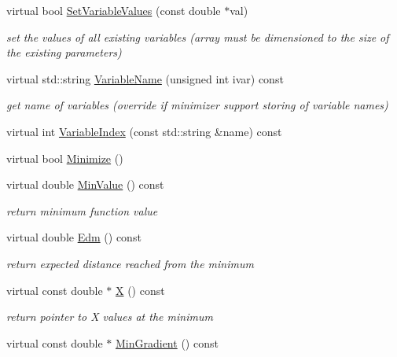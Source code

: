 \begin{DoxyCompactItemize}
virtual bool \mbox{\hyperlink{classROOT_1_1Minuit2_1_1Minuit2Minimizer_a9511e9711f3d1505556af30046c87d03}{Set\+Variable\+Values}} (const double $\ast$val)
\begin{DoxyCompactList}\small\item\em set the values of all existing variables (array must be dimensioned to the size of the existing parameters) \end{DoxyCompactList}\item 
virtual std\+::string \mbox{\hyperlink{classROOT_1_1Minuit2_1_1Minuit2Minimizer_a8f5a6dc65fdfeb0351039d80f7c94968}{Variable\+Name}} (unsigned int ivar) const
\begin{DoxyCompactList}\small\item\em get name of variables (override if minimizer support storing of variable names) \end{DoxyCompactList}\item 
virtual int \mbox{\hyperlink{classROOT_1_1Minuit2_1_1Minuit2Minimizer_a93839e851d16fff50898af2159d8863d}{Variable\+Index}} (const std\+::string \&name) const
\item 
virtual bool \mbox{\hyperlink{classROOT_1_1Minuit2_1_1Minuit2Minimizer_af5d2da195d2b1a7eac6d9b8859eec2b9}{Minimize}} ()
\item 
virtual double \mbox{\hyperlink{classROOT_1_1Minuit2_1_1Minuit2Minimizer_a4a1c7fc174527aefab3d8c87bf8c0672}{Min\+Value}} () const
\begin{DoxyCompactList}\small\item\em return minimum function value \end{DoxyCompactList}\item 
virtual double \mbox{\hyperlink{classROOT_1_1Minuit2_1_1Minuit2Minimizer_ab9c1bfaaaf4c12acd1fd96ece3509269}{Edm}} () const
\begin{DoxyCompactList}\small\item\em return expected distance reached from the minimum \end{DoxyCompactList}\item 
virtual const double $\ast$ \mbox{\hyperlink{classROOT_1_1Minuit2_1_1Minuit2Minimizer_ac9372eb08937cf14acb8862ba3166c26}{X}} () const
\begin{DoxyCompactList}\small\item\em return pointer to X values at the minimum \end{DoxyCompactList}\item 
virtual const double $\ast$ \mbox{\hyperlink{classROOT_1_1Minuit2_1_1Minuit2Minimizer_a52c6b3a13108b64366b1acd43f7e2b9a}{Min\+Gradient}} () const

\end{DoxyCompactItemize}
